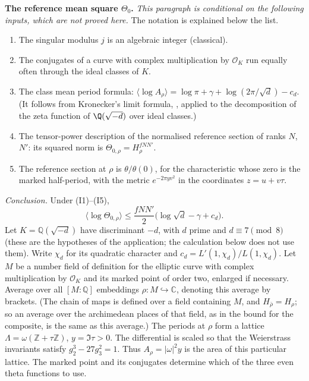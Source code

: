 \documentclass[11pt,letterpaper]{article}
\begin{document}
\textbf{The reference mean square $\Theta_0$.} \emph{This paragraph is conditional on the following
inputs, which are not proved here.} The notation is explained below the list.
\begin{enumerate}[label=\textup{(I\arabic*)},leftmargin=2.6em,itemsep=1pt,topsep=3pt]
\item The singular modulus $j$ is an algebraic integer (classical).
\item The conjugates of a curve with complex multiplication by $\mathcal O_K$ run equally often through the
ideal classes of $K$.
\item The class mean period formula: $\langle\log A_\rho\rangle=\log\pi+\gamma+\log(2\pi/\sqrt d)-c_d$. (It follows from Kronecker's limit formula, \cite[Ch.~VIII, \S8]{Wei76}, applied to the decomposition of the zeta function of $\Q(\sqrt{-d})$ over ideal classes.)
\item The tensor-power description of the normalised reference section of ranks $N$, $N'$: its squared
norm is $\Theta_{0,\rho}=H_\rho^{fNN'}$.
\item The reference section at $\rho$ is $\theta/\theta(0)$, for the characteristic whose zero is the
marked half-period, with the metric $e^{-2\pi yv^2}$ in the coordinates $z=u+v\tau$.
\end{enumerate}
\emph{Conclusion.} Under (I1)--(I5),
\begin{equation}\label{D:162}
 \langle\log\Theta_{0,\rho}\rangle\le\frac{fNN'}2\big(\log\sqrt d-\gamma+c_d\big).
\end{equation}
Let $K=\mathbb Q(\sqrt{-d})$ have discriminant $-d$, with $d$ prime and
$d\equiv7\pmod8$ (these are the hypotheses of the application; the calculation below does not use them). Write $\chi_d$ for its quadratic character and
$c_d=L'(1,\chi_d)/L(1,\chi_d)$. Let $M$ be a number field of definition
for the elliptic curve with complex multiplication by $\mathcal O_K$
and its marked point of order two, enlarged if necessary. Average over
all $[M:\mathbb Q]$ embeddings $\rho:M\hookrightarrow\mathbb C$, denoting
this average by brackets. (The chain of maps is defined over a field containing $M$, and
$H_{\bar\rho}=H_\rho$; so an average over the archimedean places of that field, as in the bound for the
composite, is the same as this average.) The periods at $\rho$ form a lattice
$\Lambda=\omega(\mathbb Z+\tau\mathbb Z)$, $y=\Im\tau>0$. The differential
is scaled so that the Weierstrass invariants satisfy
$g_2^3-27g_3^2=1$. Thus $A_\rho=|\omega|^2y$ is the area of this
particular lattice. The marked point and its conjugates determine which
of the three even theta functions to use.
\end{document}
